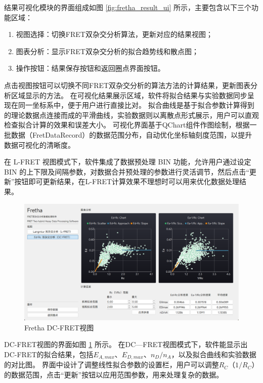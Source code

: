 结果可视化模块的界面组成如图 \ref{fig:fretha_result_ui} 所示，主要包含以下三个功能区域：
\begin{enumerate}
  \item 视图选择：切换FRET双杂交分析算法，更新对应的结果视图；
  \item 图表分析：显示FRET双杂交分析的拟合趋势线和散点图；
  \item 操作按钮：结果保存按钮和返回圈点界面按钮。
\end{enumerate}

点击视图按钮可以切换不同FRET双杂交分析的算法方法的计算结果，更新图表分析区域显示的方法。
在可视化结果展示区域，软件将拟合结果与实验数据同步呈现在同一坐标系中，便于用户进行直接比对。
拟合曲线是基于拟合参数计算得到的理论数据点连接而成的平滑曲线，实验数据则以离散点形式展示，用户可以直观检查拟合计算的效果和误差大小。
可视化界面基于QChart组件作图绘制，根据一批数据（FretDataRecord）的数据范围分布，自动优化坐标轴刻度范围，以提升数据可视化的清晰度。

在 L-FRET 视图模式下，软件集成了数据预处理 BIN 功能，允许用户通过设定 BIN 的上下限及间隔参数，对数据合并预处理的参数进行灵活调节，然后点击“更新”按钮即可更新结果，在L-FRET计算效果不理想时可以用来优化数据处理结果。

\begin{figure}[htbp]
  \centering
  \includegraphics[width=0.9\linewidth]{../figures/2/2_DC-FRET结果界面.png}
  \caption{Fretha DC-FRET视图}
  \label{fig:fretha_dc_fret}
\end{figure}

DC-FRET视图的界面如图 \ref{fig:fretha_dc_fret} 所示。
在DC—FRET视图模式下，软件能显示出DC-FRET的拟合结果，包括$E_{A,max}$、$E_{D,max}$、$n_D/n_A$，以及拟合曲线和实验数据的对比图。
界面中设计了调整线性拟合参数的设置栏，用户可以调整$R_C$（$1/R_C$）的数据范围，点击“更新”按钮以应用范围参数，用来处理复杂的数据。

